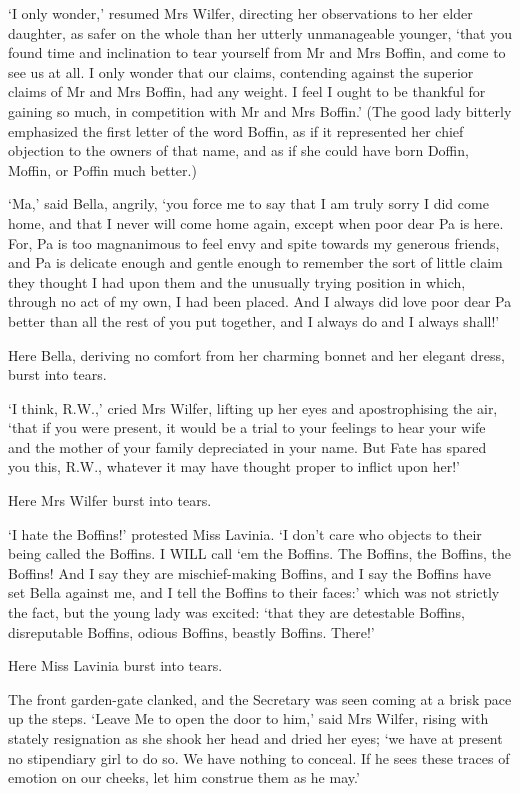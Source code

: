 ‘I only wonder,’ resumed Mrs Wilfer, directing her observations to her
elder daughter, as safer on the whole than her utterly unmanageable
younger, ‘that you found time and inclination to tear yourself from
Mr and Mrs Boffin, and come to see us at all. I only wonder that our
claims, contending against the superior claims of Mr and Mrs Boffin,
had any weight. I feel I ought to be thankful for gaining so much, in
competition with Mr and Mrs Boffin.’ (The good lady bitterly emphasized
the first letter of the word Boffin, as if it represented her chief
objection to the owners of that name, and as if she could have born
Doffin, Moffin, or Poffin much better.)

‘Ma,’ said Bella, angrily, ‘you force me to say that I am truly sorry I
did come home, and that I never will come home again, except when poor
dear Pa is here. For, Pa is too magnanimous to feel envy and spite
towards my generous friends, and Pa is delicate enough and gentle enough
to remember the sort of little claim they thought I had upon them and
the unusually trying position in which, through no act of my own, I had
been placed. And I always did love poor dear Pa better than all the rest
of you put together, and I always do and I always shall!’

Here Bella, deriving no comfort from her charming bonnet and her elegant
dress, burst into tears.

‘I think, R.W.,’ cried Mrs Wilfer, lifting up her eyes and
apostrophising the air, ‘that if you were present, it would be a
trial to your feelings to hear your wife and the mother of your family
depreciated in your name. But Fate has spared you this, R.W., whatever
it may have thought proper to inflict upon her!’

Here Mrs Wilfer burst into tears.

‘I hate the Boffins!’ protested Miss Lavinia. ‘I don’t care who objects
to their being called the Boffins. I WILL call ‘em the Boffins. The
Boffins, the Boffins, the Boffins! And I say they are mischief-making
Boffins, and I say the Boffins have set Bella against me, and I tell the
Boffins to their faces:’ which was not strictly the fact, but the
young lady was excited: ‘that they are detestable Boffins, disreputable
Boffins, odious Boffins, beastly Boffins. There!’

Here Miss Lavinia burst into tears.

The front garden-gate clanked, and the Secretary was seen coming at a
brisk pace up the steps. ‘Leave Me to open the door to him,’ said Mrs
Wilfer, rising with stately resignation as she shook her head and dried
her eyes; ‘we have at present no stipendiary girl to do so. We have
nothing to conceal. If he sees these traces of emotion on our cheeks,
let him construe them as he may.’

